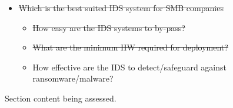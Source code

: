 \begin{notes}

    \begin{itemize}
        \item \sout{Which is the best suited IDS system for SMB companies}
        \begin{itemize}
            \item \sout{How easy are the IDS systems to by-pass?}
            \item \sout{What are the minimum HW required for deployment?}
            \item How effective are the IDS to detect/safeguard against ransomware/malware?
        \end{itemize}

    \end{itemize}
    
    
Section content being assessed.
    
\end{notes}






